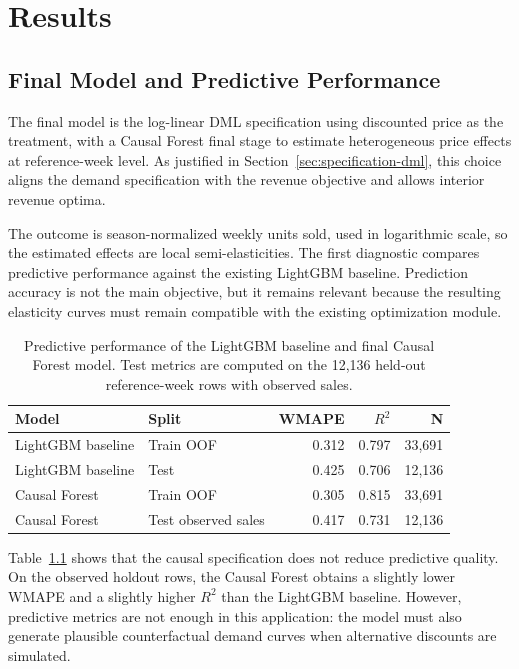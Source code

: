 \chapter{Results}

\label{Chapter5}

\section{Final Model and Predictive Performance}

The final model is the log-linear DML specification using discounted price as the treatment, with a Causal Forest final stage to estimate heterogeneous price effects at reference-week level. As justified in Section~\ref{sec:specification-dml}, this choice aligns the demand specification with the revenue objective and allows interior revenue optima.

The outcome is season-normalized weekly units sold, used in logarithmic scale, so the estimated effects are local semi-elasticities. The first diagnostic compares predictive performance against the existing LightGBM baseline. Prediction accuracy is not the main objective, but it remains relevant because the resulting elasticity curves must remain compatible with the existing optimization module.

\begin{table}[h]
\centering
\small
\begin{tabular}{llrrr}
\toprule
\textbf{Model} & \textbf{Split} & \textbf{WMAPE} & \textbf{$R^2$} & \textbf{N} \\
\midrule
LightGBM baseline & Train OOF & 0.312 & 0.797 & 33,691 \\
LightGBM baseline & Test & 0.425 & 0.706 & 12,136 \\
Causal Forest & Train OOF & 0.305 & 0.815 & 33,691 \\
Causal Forest & Test observed sales & 0.417 & 0.731 & 12,136 \\
\bottomrule
\end{tabular}
\caption{Predictive performance of the LightGBM baseline and final Causal Forest model. Test metrics are computed on the 12,136 held-out reference-week rows with observed sales.}
\label{tab:model-predictive-performance}
\end{table}

Table~\ref{tab:model-predictive-performance} shows that the causal specification does not reduce predictive quality. On the observed holdout rows, the Causal Forest obtains a slightly lower WMAPE and a slightly higher $R^2$ than the LightGBM baseline. However, predictive metrics are not enough in this application: the model must also generate plausible counterfactual demand curves when alternative discounts are simulated.

